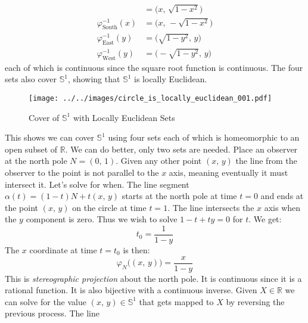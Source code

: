 \documentclass{article}
\theoremstyle{plain}
\theoremstyle{normal}
\newenvironment{example}{%
    \pushQED{\qed}\renewcommand{\qedsymbol}{$\blacksquare$}\examplex%
}{%
    \popQED\endexamplex%
}
\begin{document}
\begin{example}
\begin{align}
                &=\big(x,\,\sqrt{1-x^{2}}\big)\\
                \varphi_{\textrm{South}}^{-1}(x)
                &=\big(x,\,-\sqrt{1-x^{2}}\big)\\
                \varphi_{\textrm{East}}^{-1}(y)
                &=\big(\sqrt{1-y^{2}},\,y\big)\\
                \varphi_{\textrm{West}}^{-1}(y)
                &=\big(-\sqrt{1-y^{2}},\,y\big)
            \end{align}
            each of which is continuous since the square root function is
            continuous. The four sets also cover $\mathbb{S}^{1}$, showing that
            $\mathbb{S}^{1}$ is locally Euclidean.
        \end{example}
        \begin{figure}
            \centering
            \texttt{[image: ../../images/circle\_is\_locally\_euclidean\_001.pdf]}
            \caption{Cover of $\mathbb{S}^{1}$ with Locally Euclidean Sets}
            \label{fig:circle_is_locally_euclidean_001}
        \end{figure}
        This shows we can cover $\mathbb{S}^{1}$ using four sets each of which
        is homeomorphic to an open subset of $\mathbb{R}$. We can do better,
        only two sets are needed. Place an observer at the north pole
        $N=(0,\,1)$. Given any other point $(x,\,y)$ the line from the
        observer to the point is not parallel to the $x$ axis, meaning
        eventually it must intersect it. Let's solve for when. The line segment
        $\alpha(t)=(1-t)N+t(x,\,y)$ starts at the north pole at time $t=0$ and
        ends at the point $(x,\,y)$ on the circle at time $t=1$. The line
        intersects the $x$ axis when the $y$ component is zero. Thus we wish
        to solve $1-t+ty=0$ for $t$. We get:
        \begin{equation}
            t_{0}=\frac{1}{1-y}
        \end{equation}
        The $x$ coordinate at time $t=t_{0}$ is then:
        \begin{equation}
            \varphi_{N}\big((x,\,y)\big)
            =\frac{x}{1-y}
        \end{equation}
        This is \textit{stereographic projection} about the north pole. It is
        continuous since it is a rational function. It is also bijective with a
        continuous inverse. Given $X\in\mathbb{R}$ we can solve for the value
        $(x,\,y)\in\mathbb{S}^{1}$ that gets mapped to $X$ by reversing the
        previous process. The line
\end{document}

